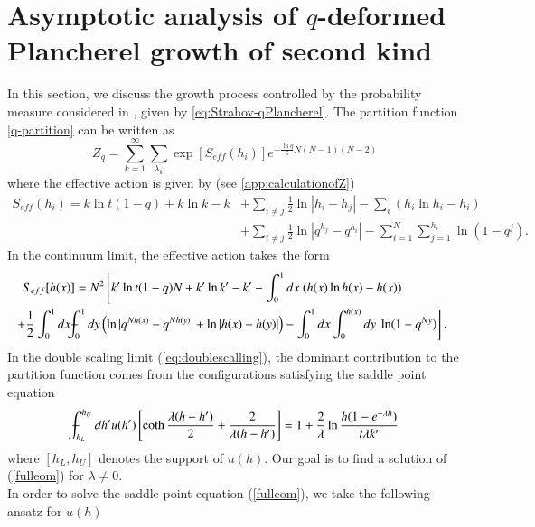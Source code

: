 \documentclass[3p,12pt]{elsarticle}
\numberwithin{equation}{section}
\begin{document}
\section{Asymptotic analysis of $q$-deformed Plancherel growth of second kind}
\label{subsec:qdkind1}


In this section, we discuss the growth process controlled by the \qd probability measure considered in \cite{Strahov07}, given by \eqref{eq:Strahov-qPlancherel}. The partition function \eqref{q-partition} can be written as
\begin{equation}\label{eq:PF_Strahov}
Z_q=\sum_{k=1}^{\infty}\sum_{\lambda_k} \exp[S_{eff}(h_i)]e^{-\frac{\ln q}{6}N(N-1)(N-2)}
\end{equation}
where the effective action is given by (see \ref{app:calculationofZ})
\begin{equation}
\label{eff-S}
\begin{aligned}
S_{eff}(h_i) = k\ln t(1-q) +k\ln k -k & + \sum_{ i\neq j} \frac{1}{2} \ln |h_i-h_j|-\sum_{i} (h_i \ln h_i -h_i) \\
& + \sum_{ i\neq j}  \frac{1}{2}\ln |q^{h_j}-q^{h_i}| -\sum_{i=1}^{N} \sum_{j=1}^{h_i} \ln (1-q^j).
\end{aligned}
\end{equation}
In the continuum limit, the effective action takes the form
\begin{equation}
\begin{aligned}
S_{eff}[h(x)]&=N^2\left[k'\ln t(1-q)N+k' \ln k' -k'-\int_0^1 dx\ (h(x)\ln h(x)-h(x))\right.\\
&\hspace*{-1.7cm}\left.+\frac{1}{2}\int_0^1 dx \Xint-_{0}^{1} dy \left(\ln |q^{Nh(x)}-q^{Nh(y)}|
+\ln|h(x)-h(y)|\right)-\int_0^1 dx \int_0^{h(x)}dy\ \ln(1-q^{Ny})\right].
\end{aligned}
\end{equation}
In the double scaling limit (\ref{eq:doublescalling}), the dominant contribution to the partition function comes from the configurations satisfying the saddle point equation
\begin{equation}
\label{fulleom}
\Xint-_{h_{L}}^{h_{U}} dh' u(h')\left[\coth \frac{\lambda(h-h')}{2}+\frac{2}{\lambda(h-h')}\right]=1+\frac{2}{\lambda}\ln \frac{h(1-e^{-\lambda h})}{t\lambda k'}
\end{equation}
where $[h_L,h_U]$ denotes the support of $u(h)$. Our goal is to find a solution of (\ref{fulleom}) for $\lambda\neq 0$.\\
In order to solve the saddle point equation (\ref{fulleom}), we take the following ansatz for $u(h)$
\end{document}
